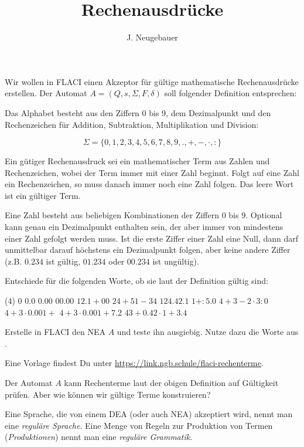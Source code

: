 \documentclass[10pt, a4paper]{scrartcl}
\author{J. Neugebauer}
\title{Rechenausdrücke}
\date{\Heute}
\begin{document}
\ReiheTitel

Wir wollen in FLACI einen Akzeptor für gültige mathematische Rechenausdrücke erstellen. Der Automat $A = (Q, s, \Sigma, F, \delta)$ soll folgender Definition entsprechen:

Das Alphabet besteht aus den Ziffern 0 bis 9, dem Dezimalpunkt und den Rechenzeichen für Addition, Subtraktion, Multiplikation und Division:

\[ \Sigma = \{0,1,2,3,4,5,6,7,8,9,.,+,-,\cdot,:\} \]

Ein gütiger Rechenausdruck sei ein mathematischer Term aus Zahlen und Rechenzeichen, wobei der Term immer mit einer Zahl beginnt. Folgt auf eine Zahl ein Rechenzeichen, so muss danach immer noch eine Zahl folgen. Das leere Wort ist ein gültiger Term.

Eine Zahl besteht aus beliebigen Kombinationen der Ziffern 0 bis 9. Optional kann genau ein Dezimalpunkt enthalten sein, der aber immer von mindestens einer Zahl gefolgt werden muss. Ist die erste Ziffer einer Zahl eine Null, dann darf unmittelbar darauf höchstens ein Dezimalpunkt folgen, aber keine andere Ziffer (z.B. $0.234$ ist gültig, $01.234$ oder $00.234$ ist ungültig).

\begin{aufgabe}\label{aufg:worte}
	Entschiede für die folgenden Worte, ob sie laut der Definition gültig sind:
	
	\begin{tasks}(4)
		\task $0$
		\task $0.0$
		\task $0.00$
		\task $00.00$
		\task $12.1+00$
		\task $24+51-34$
		\task $124.42.1$
		\task $1+:5.0$
		\task $4+3-2\cdot3:0$
		\task $4+3\cdot0.001+$
		\task $4+3\cdot0.001+7.2$
		\task $43+0.42\cdot1+3.4$
	\end{tasks}
\end{aufgabe}

\begin{aufgabe}
	Erstelle in FLACI den NEA $A$ und teste ihn ausgiebig. Nutze dazu die Worte aus .
	
	Eine Vorlage findest Du unter \url{https://link.ngb.schule/flaci-rechenterme}.
\end{aufgabe}

Der Automat $A$ kann Rechenterme laut der obigen Definition auf Gültigkeit prüfen. Aber wie können wir gültige Terme konstruieren?

Eine Sprache, die von einem DEA (oder auch NEA) akzeptiert wird, nennt man eine \emph{reguläre Sprache}. Eine Menge von Regeln zur Produktion von Termen (\emph{Produktionen}) nennt man eine \emph{reguläre Grammatik}.
\end{document}
